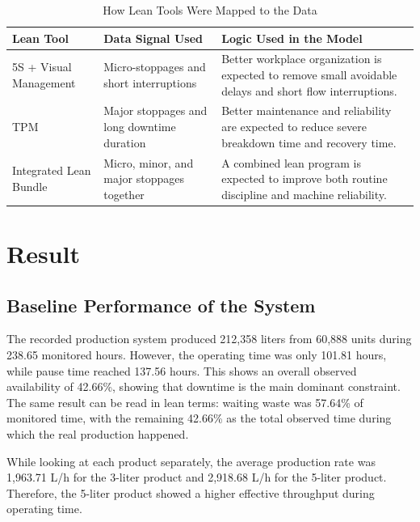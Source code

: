 \documentclass[12pt,a4paper]{article}
\begin{document}
\begin{table}[H]
\centering
\caption{How Lean Tools Were Mapped to the Data}
\begin{tabular}{p{3.0cm}p{4.2cm}p{6.0cm}}
\toprule
\textbf{Lean Tool} & \textbf{Data Signal Used} & \textbf{Logic Used in the Model} \\
\midrule
5S + Visual Management & Micro-stoppages and short interruptions & Better workplace organization is expected to remove small avoidable delays and short flow interruptions. \\
TPM & Major stoppages and long downtime duration & Better maintenance and reliability are expected to reduce severe breakdown time and recovery time. \\
Integrated Lean Bundle & Micro, minor, and major stoppages together & A combined lean program is expected to improve both routine discipline and machine reliability. \\
\bottomrule
\end{tabular}
\end{table}

\section{Result}
\subsection{Baseline Performance of the System}
The recorded production system produced 212,358 liters from 60,888 units during 238.65 monitored hours. However, the operating time was only 101.81 hours, while pause time reached 137.56 hours. This shows an overall observed availability of 42.66\%, showing that downtime is the main dominant constraint. The same result can be read in lean terms: waiting waste was 57.64\% of monitored time, with the remaining 42.66\% as the total observed time during which the real production happened.

While looking at each product separately, the average production rate was 1,963.71 L/h for the 3-liter product and 2,918.68 L/h for the 5-liter product. Therefore, the 5-liter product showed a higher effective throughput during operating time.
\end{document}
